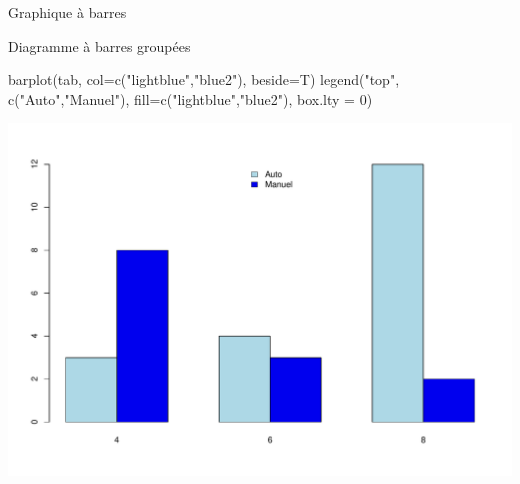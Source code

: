 \documentclass[
  8pt,
  ignorenonframetext,
]{beamer}
\newenvironment{Shaded}{\begin{snugshade}}{\end{snugshade}}
\newcommand{\AttributeTok}[1]{\textcolor[rgb]{0.77,0.63,0.00}{#1}}
\newcommand{\DecValTok}[1]{\textcolor[rgb]{0.00,0.00,0.81}{#1}}
\newcommand{\FunctionTok}[1]{\textcolor[rgb]{0.00,0.00,0.00}{#1}}
\newcommand{\NormalTok}[1]{#1}
\newcommand{\StringTok}[1]{\textcolor[rgb]{0.31,0.60,0.02}{#1}}
\begin{document}
\begin{frame}[fragile]{Graphique à barres}
\protect\hypertarget{graphique-uxe0-barres-3}{}
\begin{block}{Diagramme à barres groupées}
\protect\hypertarget{diagramme-uxe0-barres-groupuxe9es-1}{}
\begin{Shaded}
\begin{Highlighting}[]
\FunctionTok{barplot}\NormalTok{(tab, }\AttributeTok{col=}\FunctionTok{c}\NormalTok{(}\StringTok{"lightblue"}\NormalTok{,}\StringTok{"blue2"}\NormalTok{), }\AttributeTok{beside=}\NormalTok{T)}
\FunctionTok{legend}\NormalTok{(}\StringTok{"top"}\NormalTok{, }\FunctionTok{c}\NormalTok{(}\StringTok{"Auto"}\NormalTok{,}\StringTok{"Manuel"}\NormalTok{), }\AttributeTok{fill=}\FunctionTok{c}\NormalTok{(}\StringTok{"lightblue"}\NormalTok{,}\StringTok{"blue2"}\NormalTok{), }\AttributeTok{box.lty =} \DecValTok{0}\NormalTok{)}
\end{Highlighting}
\end{Shaded}

\begin{center}\includegraphics[width=0.8\linewidth]{Chap2_R_files/figure-beamer/unnamed-chunk-17-1} \end{center}
\end{block}
\end{frame}
\end{document}
